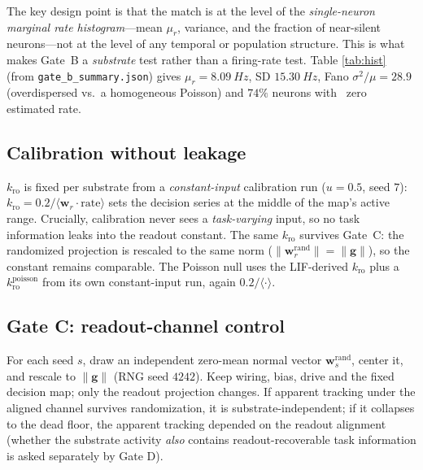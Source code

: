 \documentclass[10pt,a4paper]{article}
\begin{document}
The key design point is that the match is at the level of the
\emph{single-neuron marginal rate histogram}---mean $\mu_r$, variance,
and the fraction of near-silent neurons---not at the level of any
temporal or population structure. This is what makes Gate~B a
\emph{substrate} test rather than a firing-rate test. Table
\ref{tab:hist} (from \texttt{gate\_b\_summary.json}) gives
$\mu_r=\SI{8.09}{Hz}$, SD $\SI{15.30}{Hz}$, Fano
$\sigma^2/\mu=28.9$ (overdispersed vs.\ a homogeneous Poisson) and
$74\%$ neurons with ~zero estimated rate.

\begin{table}[H]
\centering
\caption{Match quality of the dead null to the LIF marginal:
per-neuron mean rate, SD, Fano factor $\sigma^2/\mu$, and the silent
fraction (neuron with $\hat r_i\approx0$). The null draws Bernoulli
events at the matched per-neuron probabilities, independent of $u$.}
\label{tab:hist}

\end{table}

\subsection{Calibration without leakage}\label{sec:calib}

$k_{\mathrm{ro}}$ is fixed per substrate from a \emph{constant-input}
calibration run ($u=0.5$, seed $7$): $k_{\mathrm{ro}}=0.2/
\langle \mathbf{w}_r\!\cdot \mathrm{rate}\rangle$ sets the decision
series at the middle of the map's active range. Crucially, calibration
never sees a \emph{task-varying} input, so no task information leaks
into the readout constant. The same $k_{\mathrm{ro}}$ survives Gate~C:
the randomized projection is rescaled to the same norm
($\|\mathbf{w}_r^{\mathrm{rand}}\|=\|\mathbf{g}\|$), so the constant
remains comparable. The Poisson null uses the LIF-derived $k_{\mathrm{ro}}$
plus a $k_{\mathrm{ro}}^{\mathrm{poisson}}$ from its own constant-input
run, again $0.2/\langle\cdot\rangle$.

\subsection{Gate C: readout-channel control}\label{sec:gatec}

For each seed $s$, draw an independent zero-mean normal vector
$\mathbf{w}^{\mathrm{rand}}_s$, center it, and rescale to
$\|\mathbf{g}\|$ (RNG seed $4242$). Keep wiring, bias, drive and the
fixed decision map; only the readout projection changes. If apparent
tracking under the aligned channel survives randomization, it is
substrate-independent; if it collapses to the dead floor, the apparent
tracking depended on the readout alignment (whether the substrate
activity \emph{also} contains readout-recoverable task information is
asked separately by Gate D).
\end{document}
